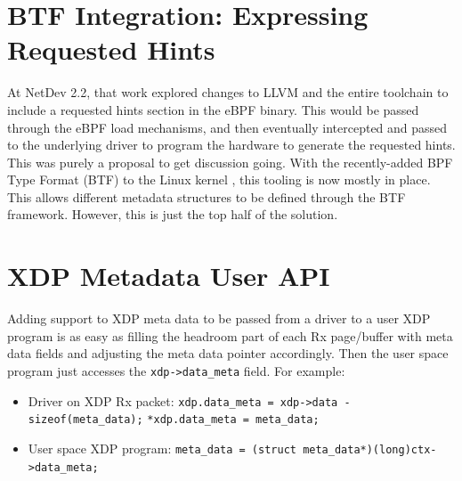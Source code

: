 \documentclass[letterpaper]{article}
\begin{document}
\section{BTF Integration: Expressing Requested Hints}
At NetDev 2.2, that work explored changes to LLVM and the entire toolchain to include a requested hints section in the eBPF binary.  This would be passed through the eBPF load mechanisms, and then eventually intercepted and passed to the underlying driver to program the hardware to generate the requested hints.  This was purely a proposal to get discussion going.
\newline
\newline
With the recently-added BPF Type Format (BTF) to the Linux kernel \cite{btf-patches-2018}, this tooling is now mostly in place.  This allows different metadata structures to be defined through the BTF framework.  However, this is just the top half of the solution.
\newline
\newline

\section{XDP Metadata User API}
Adding support to XDP meta data to be passed from a driver to a user XDP program is as easy as filling the headroom part of each Rx page/buffer with meta data fields and adjusting the meta data pointer accordingly. Then the user space program just accesses the \small{\texttt{xdp->data\_meta}} field.  For example:
\begin{itemize}
	\item Driver on XDP Rx packet:
	\newline
	{\scriptsize \texttt{xdp.data\_meta  = xdp->data - sizeof(meta\_data);}}
	{\scriptsize \texttt{*xdp.data\_meta = meta\_data;}}
	\newline
	\item User space XDP program:
	\newline
	{\scriptsize \texttt{meta\_data = (struct meta\_data*)(long)ctx->data\_meta;}}
\end{itemize}
\end{document}
